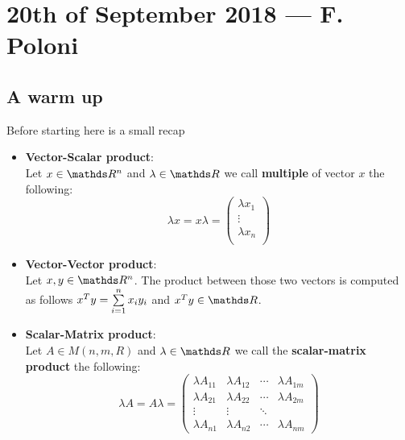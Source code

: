\documentclass[computationalMathematics.tex]{subfiles}
\begin{document}
\chapter{20th of September 2018 --- F. Poloni}

\section{A warm up}
Before starting here is a small recap
\begin{itemize}
    \item \textbf{Vector-Scalar product}:\\
      Let $x \in \R^n$ and $\lambda \in \R$ we call \textbf{multiple} of vector $x$ the following:
      \[
        \lambda x = x \lambda =
        \begin{pmatrix}
        \lambda x_1\\
        \vdots\\
        \lambda x_n\\
      \end{pmatrix}
      \]
    
    \item \textbf{Vector-Vector product}:\\
     Let $x, y \in \R^n$. The product between those two vectors is computed as follows ${x}^{T} y = \sum\limits_{i=1}^n x_i y_i$ and $\tr{x}y \in \R$.
     
     \item \textbf{Scalar-Matrix product}:\\
      Let $A \in M(n, m, R)$ and $\lambda \in \R$ we call the \textbf{scalar-matrix product} the following:
      \[
        \lambda A = A \lambda = 
        \begin{pmatrix}
        \lambda A_{11} & \lambda A_{12} & \cdots & \lambda A_{1m}\\
        \lambda A_{21} & \lambda A_{22} & \cdots & \lambda A_{2m}\\
        \vdots  &\vdots & \ddots\\
        \lambda A_{n1} & \lambda A_{n2} & \cdots & \lambda A_{nm}
        \end{pmatrix}
      \]
     

\end{itemize}
\end{document}
